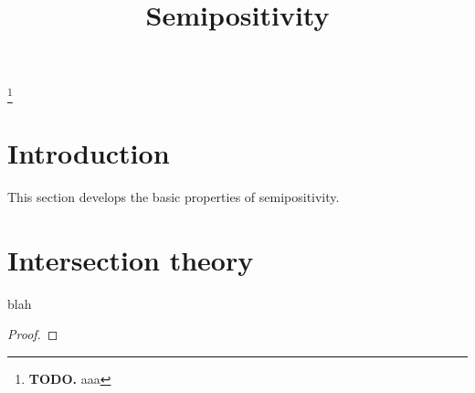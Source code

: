 


\newcommand{\todo}[1]{\footnote{\textbf{TODO.} #1}}

\title{Semipositivity}
\maketitle

\todo{aaa}

\section{Introduction}
This section develops the basic properties of semipositivity.

\section{Intersection theory}
\begin{lemma}
blah
\end{lemma}

\begin{proof}
\end{proof}







